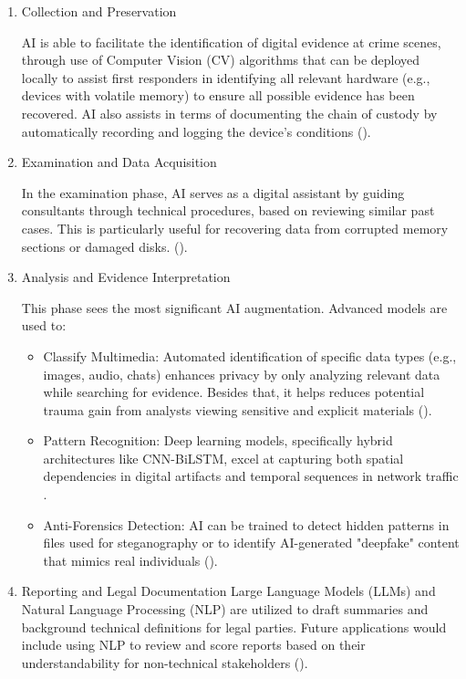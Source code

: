 \documentclass[12pt,a4paper]{article}
\begin{document}
\begin{enumerate}

\item Collection and Preservation

AI is able to facilitate the identification of digital evidence at crime scenes, through use of Computer Vision (CV) algorithms that can be deployed locally to assist first responders in identifying all relevant hardware (e.g., devices with volatile memory) to ensure all possible evidence has been recovered. AI also assists in terms of documenting the chain of custody by automatically recording and logging the device's conditions (\cite{sanna2025improving}).

\item Examination and Data Acquisition

In the examination phase, AI serves as a digital assistant by guiding consultants through technical procedures, based on reviewing similar past cases. This is particularly useful for recovering data from corrupted memory sections or damaged disks. (\cite{sanna2025improving}).

\item Analysis and Evidence Interpretation

This phase sees the most significant AI augmentation. Advanced models are used to:
\begin{itemize}
   
\item Classify Multimedia: Automated identification of specific data types (e.g., images, audio, chats) enhances privacy by only analyzing relevant data while searching for evidence. Besides that, it helps reduces potential trauma gain from analysts viewing sensitive and explicit materials (\cite{sanna2025improving}).

\item Pattern Recognition: Deep learning models, specifically hybrid architectures like CNN-BiLSTM, excel at capturing both spatial dependencies in digital artifacts and temporal sequences in network traffic \cite{11385975}.

\item Anti-Forensics Detection: AI can be trained to detect hidden patterns in files used for steganography or to identify AI-generated "deepfake" content that mimics real individuals (\cite{sanna2025improving}).

\end{itemize}

\item Reporting and Legal Documentation
Large Language Models (LLMs) and Natural Language Processing (NLP) are utilized to draft summaries and background technical definitions for legal parties. Future applications would include using NLP to review and score reports based on their understandability for non-technical stakeholders (\cite{sanna2025improving}).

\end{enumerate}
\end{document}
